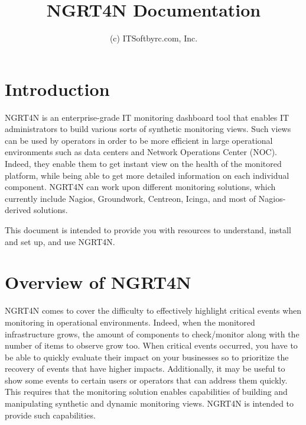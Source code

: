 \documentclass[a4paper,9pt]{article}
\title{NGRT4N Documentation}
\author{(c) ITSoftbyrc.com, Inc.}
\begin{document}
\setcounter{secnumdepth}{4}
\setcounter{tocdepth}{4}

\maketitle


\chapter{Introduction}
NGRT4N is an enterprise-grade IT monitoring dashboard tool that enables IT administrators to build various sorts of synthetic monitoring views. Such views can be used by operators in order to be more efficient in large operational environments such as data centers and Network Operations Center (NOC). Indeed, they enable them to get instant view on the health of the monitored platform, while being able to get more detailed information on each individual component. NGRT4N can work upon different monitoring solutions, which currently include Nagios, Groundwork, Centreon, Icinga, and most of Nagios-derived solutions.

This document is intended to provide you with resources to understand, install and set up, and use NGRT4N. 

\chapter{Overview of NGRT4N}
NGRT4N comes to cover the difficulty to effectively highlight critical events when monitoring in operational environments. Indeed, when the monitored infrastructure grows, the amount of components to check/monitor along with the number of items to observe grow too. When critical events occurred, you have to be able to quickly evaluate their impact on your businesses so to prioritize the recovery of events that have higher impacts. Additionally, it may be useful to show some events to certain users or operators that can address them quickly.  This requires that the monitoring solution enables capabilities of building and manipulating synthetic and dynamic monitoring views. NGRT4N is intended to provide such capabilities.
\end{document}

